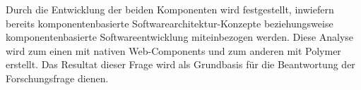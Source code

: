 Durch die Entwicklung der beiden Komponenten wird festgestellt, inwiefern bereits komponentenbasierte Softwarearchitektur-Konzepte beziehungsweise komponentenbasierte Softwareentwicklung miteinbezogen werden. Diese Analyse wird zum einen mit nativen Web-Components und zum anderen mit Polymer erstellt. Das Resultat dieser Frage wird als Grundbasis für die Beantwortung der Forschungsfrage dienen.